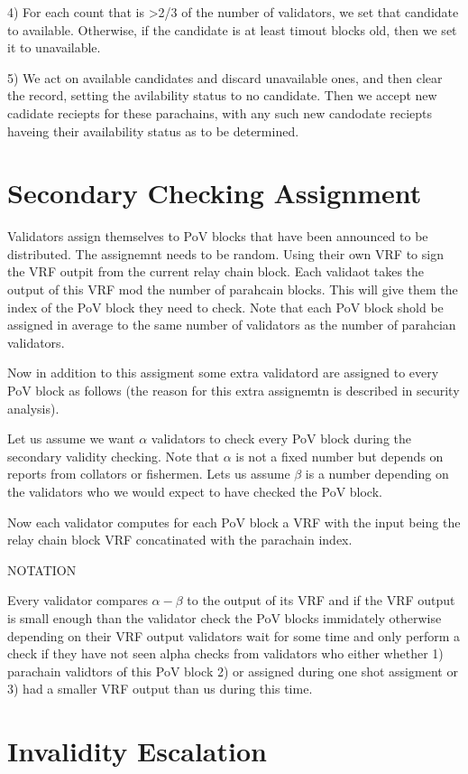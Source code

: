4) For each count that is >2/3 of the number of validators, we set that candidate to available. Otherwise, if the candidate is at least timout blocks old, then we set it to unavailable.

5) We act on available candidates and discard unavailable ones, and then clear the record, setting the avilability status to no candidate. Then we accept new cadidate reciepts for these parachains, with any such new candodate reciepts haveing their availability status as to be determined.



\section{Secondary Checking Assignment}\label{shot-assignment}
Validators assign themselves to PoV blocks that have been announced to be distributed. The assignemnt needs to be random. Using their own VRF to sign the VRF outpit from the current relay chain block. Each validaot takes the output of this VRF mod the number of parahcain blocks. This will give them the index of the PoV block they need to check. Note that each PoV block shold be assigned in average to the same number of validators as the number of parahcian validators.

Now in addition to this assigment some extra validatord are assigned to every PoV block as follows (the reason for this extra assignemtn is described in security analysis).

Let us assume we want $\alpha$ validators to check every PoV block during the secondary validity checking. Note that $\alpha$ is not a fixed number but depends on reports from collators or fishermen. Lets us assume $\beta$ is a number depending on the validators who we would expect to have checked the PoV block.  


Now each validator computes for each PoV block a VRF with the input being the relay chain block VRF concatinated with the parachain index. 

NOTATION

Every validator compares $\alpha - \beta$ to the output of its VRF and if the VRF output is small enough than the validator check the PoV blocks immidately otherwise depending on their VRF output validators wait for some time and only perform a check if they have not seen alpha checks from validators who either whether 1) parachain validtors of this PoV block 2) or assigned during one shot assigment or 3) had a smaller VRF output than us during this time. 

\section{Invalidity Escalation}\label{escalation}
